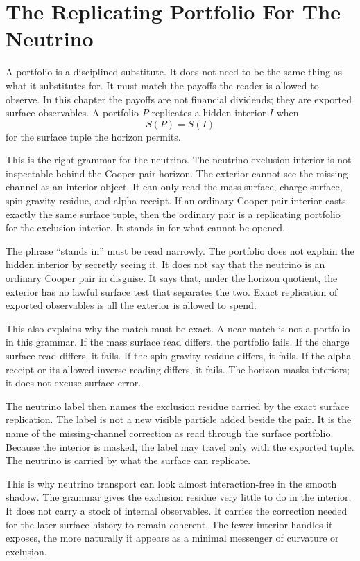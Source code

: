 \section{The Replicating Portfolio For The Neutrino}

A portfolio is a disciplined substitute. It does not need to be the same
thing as what it substitutes for. It must match the payoffs the reader is
allowed to observe. In this chapter the payoffs are not financial
dividends; they are exported surface observables. A portfolio \(P\)
replicates a hidden interior \(I\) when
\[
  S(P)=S(I)
\]
for the surface tuple the horizon permits.

This is the right grammar for the neutrino. The neutrino-exclusion interior
is not inspectable behind the Cooper-pair horizon. The exterior cannot see
the missing channel as an interior object. It can only read the mass
surface, charge surface, spin-gravity residue, and alpha receipt. If an
ordinary Cooper-pair interior casts exactly the same surface tuple, then the
ordinary pair is a replicating portfolio for the exclusion interior. It
stands in for what cannot be opened.

The phrase ``stands in'' must be read narrowly. The portfolio does not
explain the hidden interior by secretly seeing it. It does not say that the
neutrino is an ordinary Cooper pair in disguise. It says that, under the
horizon quotient, the exterior has no lawful surface test that separates the
two. Exact replication of exported observables is all the exterior is
allowed to spend.

This also explains why the match must be exact. A near match is not a
portfolio in this grammar. If the mass surface read differs, the portfolio
fails. If the charge surface read differs, it fails. If the spin-gravity
residue differs, it fails. If the alpha receipt or its allowed inverse
reading differs, it fails. The horizon masks interiors; it does not excuse
surface error.

The neutrino label then names the exclusion residue carried by the exact
surface replication. The label is not a new visible particle added beside
the pair. It is the name of the missing-channel correction as read through
the surface portfolio. Because the interior is masked, the label may travel
only with the exported tuple. The neutrino is carried by what the surface
can replicate.

This is why neutrino transport can look almost interaction-free in the
smooth shadow. The grammar gives the exclusion residue very little to do in
the interior. It does not carry a stock of internal observables. It carries
the correction needed for the later surface history to remain coherent. The
fewer interior handles it exposes, the more naturally it appears as a
minimal messenger of curvature or exclusion.

